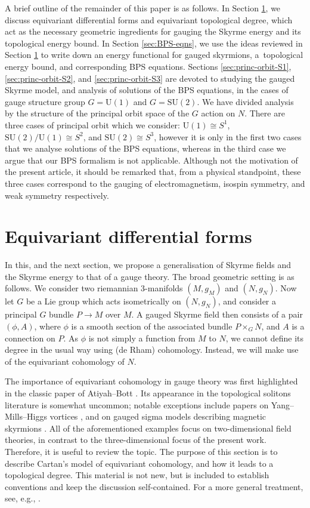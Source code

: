 \documentclass[pdftex]{sigma}
\newcommand{\SU}{{\mathrm{SU}}}
\newcommand{\U}{{\mathrm{U}}}
\newcommand{\1}{{\mathbb{1}}}
\numberwithin{equation}{section}
\begin{document}
A brief outline of the remainder of this paper is as follows. In Section \ref{sec:geometry-gauged-sky}, we discuss equivariant differential forms and equivariant topological degree, which act as the necessary geometric ingredients for gauging the Skyrme energy and its topological energy bound. In Section \ref{sec:BPS-eqns}, we use the ideas reviewed in Section \ref{sec:geometry-gauged-sky} to write down an energy functional for gauged skyrmions, a~topological energy bound, and corresponding BPS equations. Sections \ref{sec:princ-orbit-S1}, \ref{sec:princ-orbit-S2}, and \ref{sec:princ-orbit-S3} are devoted to studying the gauged Skyrme model, and analysis of solutions of the BPS equations, in the cases of gauge structure group $G=\U(1)$ and $G=\SU(2)$. We have divided analysis by the structure of the principal orbit space of the $G$ action on $N$. There are three cases of principal orbit which we consider: $\U(1)\cong S^1$, $\SU(2)/\U(1) \cong S^2$, and $\SU(2)\cong S^3$, however it is only in the first two cases that we analyse solutions of the BPS equations, whereas in the third case we argue that our BPS formalism is not applicable. Although not the motivation of the present article, it should be remarked that, from a physical standpoint, these three cases correspond to the gauging of electromagnetism, isospin symmetry, and weak symmetry respectively.
\section{Equivariant differential forms}\label{sec:geometry-gauged-sky}
In this, and the next section, we propose a generalisation of Skyrme fields and the Skyrme energy to that of a gauge theory. The broad geometric setting is as follows. We consider two riemannian 3-manifolds $(M,g_M)$ and $(N,g_N)$. Now let $G$ be a Lie group which acts isometrically on $(N,g_N)$, and consider a principal $G$ bundle $P\to M$ over $M$. A gauged Skyrme field then consists of a pair $(\phi,A)$, where $\phi$ is a smooth section of the associated bundle $P\times_GN$, and $A$ is a connection on $P$. As $\phi$ is not simply a function from $M$ to $N$, we cannot define its degree in the usual way using (de Rham) cohomology. Instead, we will make use of the equivariant cohomology of $N$.

The importance of equivariant cohomology in gauge theory was first highlighted in the classic paper of Atiyah--Bott \cite{atiyahbott1983YMriem}. Its appearance in the topological solitons literature is somewhat uncommon; notable exceptions include papers on Yang--Mills--Higgs vortices \cite{CieliebakGaioMundetIRieraSalamon2002symplectic,mundet1999yang,SpeightRomao2020}, and on gauged sigma models describing magnetic skyrmions \cite{walton2020geometry}. All of the aforementioned examples focus on two-dimensional field theories, in contrast to the three-dimensional focus of the present work. Therefore, it is useful to review the topic. The purpose of this section is to describe Cartan's model of equivariant cohomology, and how it leads to a topological degree. This material is not new, but is included to establish conventions and keep the discussion self-contained. For a more general treatment, see, e.g., \cite{atiyahbott1984moment,berlineGetzlerVergne2003}.
\end{document}
